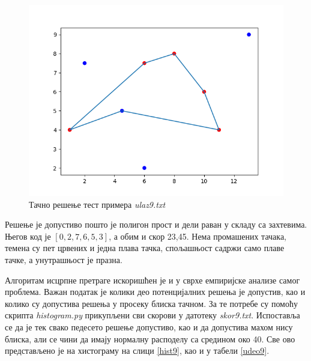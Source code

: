\documentclass[a4paper]{article}
\begin{document}
\begin{figure}[h!]
\begin{center}
\includegraphics[scale=0.64]{iscrpna9.png}
\end{center}
\caption{Тачно решење тест примера \textit{ulaz9.txt}}
\label{iscrpna9}
\end{figure}

Решење је допустиво пошто је полигон прост и дели раван у складу са захтевима. Његов код је $[0, 2, 7, 6, 5, 3]$, а обим и скор 23,45. Нема промашених тачака, темена су пет црвених и једна плава тачка, спољашњост садржи само плаве тачке, а унутрашњост је празна.

Алгоритам исцрпне претраге искоришћен је и у сврхе емпиријске анализе самог проблема. Важан податак је колики део потенцијалних решења је допустив, као и колико су допустива решења у просеку блиска тачном. За те потребе су помоћу скрипта \textit{histogram.py} прикупљени сви скорови у датотеку \textit{skor9.txt}. Испоставља се да је тек свако педесето решење допустиво, као и да допустива махом нису блиска, али се чини да имају нормалну расподелу са средином око 40. Све ово представљено је на хистограму на слици \ref{hist9}, као и у табели \ref{udeo9}.
\end{document}
